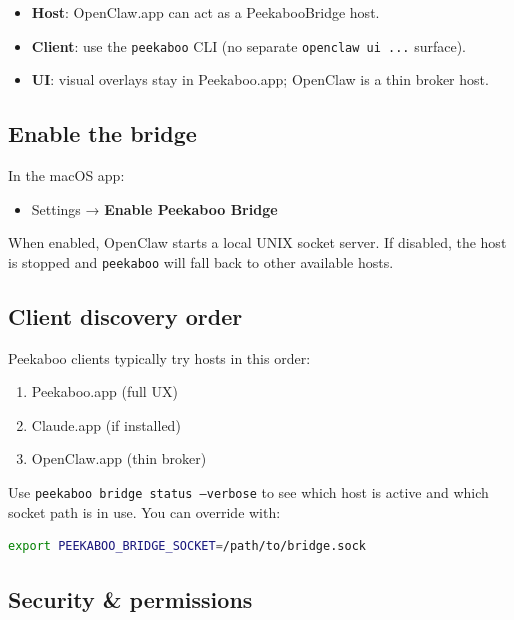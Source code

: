 \begin{itemize}
  \item \textbf{Host}: OpenClaw.app can act as a PeekabooBridge host.
  \item \textbf{Client}: use the \texttt{peekaboo} CLI (no separate \texttt{openclaw ui ...} surface).
  \item \textbf{UI}: visual overlays stay in Peekaboo.app; OpenClaw is a thin broker host.
\end{itemize}


\subsection{Enable the bridge}


In the macOS app:

\begin{itemize}
  \item Settings → \textbf{Enable Peekaboo Bridge}
\end{itemize}


When enabled, OpenClaw starts a local UNIX socket server. If disabled, the host
is stopped and \texttt{peekaboo} will fall back to other available hosts.

\subsection{Client discovery order}


Peekaboo clients typically try hosts in this order:

\begin{enumerate}
  \item Peekaboo.app (full UX)
  \item Claude.app (if installed)
  \item OpenClaw.app (thin broker)
\end{enumerate}


Use \texttt{peekaboo bridge status --verbose} to see which host is active and which
socket path is in use. You can override with:

\begin{lstlisting}[language=bash]
export PEEKABOO_BRIDGE_SOCKET=/path/to/bridge.sock
\end{lstlisting}


\subsection{Security \& permissions}


